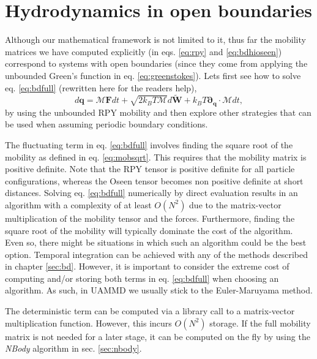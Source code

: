 \documentclass[ twoside,openright,titlepage,numbers=noenddot,%
headinclude,footinclude,cleardoublepage=empty,abstract=on,
BCOR=5mm,paper=a4,fontsize=11pt, dvipsnames
]{scrreprt}
\renewcommand{\vec}[1]{\bm{#1}}
\newcommand{\tens}[1]{\bm{\mathcal{#1}}}
\newcommand{\uammd}{\gls{UAMMD}\xspace}
\newcommand{\kT}{k_B T}
\newcommand{\noise}{\widetilde{W}}
\newcommand{\ppos}{q}
\begin{document}
\chapter{Hydrodynamics in open boundaries}
Although our mathematical framework is not limited to it, thus far the mobility matrices we have computed explicitly (in eqs. \eqref{eq:rpy} and \eqref{eq:bdhioseen}) correspond to systems with open boundaries (since they come from applying the unbounded Green's function in eq. \eqref{eq:greenstokes}). Lets first see how to solve eq. \eqref{eq:bdfull} (rewritten here for the readers help),
$$  d\vec{\ppos} =\tens{M}\vec{F}dt + \sqrt{2\kT\tens{M}}d\vec{\noise} + \kT\vec{\partial}_{\vec{\ppos}}\cdot\tens{M}dt,$$
by using the unbounded \gls{RPY} mobility and then explore other strategies that can be used when assuming periodic boundary conditions.

The fluctuating term in eq. \eqref{eq:bdfull} involves finding the square root of the mobility as defined in eq. \eqref{eq:mobsqrt}.
This requires that the mobility matrix is positive definite. Note that the \gls{RPY} tensor is positive definite for all particle configurations, whereas the Oseen tensor becomes non positive definite at short distances.
Solving eq. \eqref{eq:bdfull} numerically by direct evaluation results in an algorithm with a complexity of at least $O(N^2)$ due to the matrix-vector multiplication of the mobility tensor and the forces. Furthermore, finding the square root of the mobility will typically dominate the cost of the algorithm. Even so, there might be situations in which such an algorithm could be the best option.
Temporal integration can be achieved with any of the methods described in chapter \ref{sec:bd}. However, it is important to consider the extreme cost of computing and/or storing both terms in eq. \eqref{eq:bdfull} when choosing an algorithm. As such, in \uammd we usually stick to the Euler-Maruyama method.

The deterministic term can be computed via a library call to a matrix-vector multiplication function. However, this incurs $O(N^2)$ storage. If the full mobility matrix is not needed for a later stage, it can be computed on the fly by using the \emph{NBody} algorithm in sec. \ref{sec:nbody}.
\end{document}
